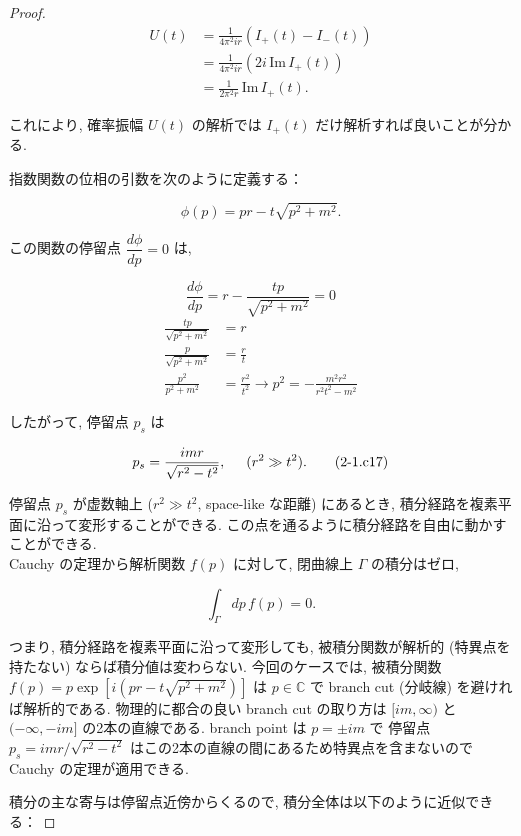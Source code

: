 \documentclass[a4paper,12pt]{article}
\begin{document}
\begin{proof}
\begin{align*}
  U(t) &= \frac{1}{4\pi^2 ir} \left( I_+(t) - I_-(t) \right) \tag{2-1.c9} \\
  &= \frac{1}{4\pi^2 ir} \left( 2i \, \textrm{Im}\, I_+(t) \right) \tag{2-1.c10} \\
  &= \frac{1}{2\pi^2 r} \, \textrm{Im}\, I_+(t). \tag{2-1.c11}
\end{align*}

これにより, 確率振幅 $U(t)$ の解析では $I_+(t)$ だけ解析すれば良いことが分かる.\par
指数関数の位相の引数を次のように定義する：

\begin{equation*}
  \phi(p) = pr - t\sqrt{p^2 + m^2}. \tag{2-1.c12}
\end{equation*}

この関数の停留点 $\dfrac{d\phi}{dp} = 0$ は,

\begin{equation*}
  \frac{d\phi}{dp} = r - \frac{tp}{\sqrt{p^2 + m^2}} = 0 \tag{2-1.c13}
\end{equation*}
\begin{align*}
  \frac{tp}{\sqrt{p^2 + m^2}} &= r \tag{2-1.c14} \\
  \frac{p}{\sqrt{p^2 + m^2}} &= \frac{r}{t} \tag{2-1.c15} \\
  \frac{p^2}{p^2 + m^2} &= \frac{r^2}{t^2} \to p^2 = -\frac{m^2 r^2}{r^2t^2 - m^2} \tag{2-1.c16}
\end{align*}

したがって, 停留点 $p_s$ は

\begin{equation*}
  p_s = \frac{imr}{\sqrt{r^2 - t^2}}, \hspace{0.5cm} (r^2 \gg t^2). \tag{2-1.c17}
\end{equation*}

停留点 $p_s$ が虚数軸上 ($r^2 \gg t^2$, space-like な距離) にあるとき, 積分経路を複素平面に沿って変形することができる. この点を通るように積分経路を自由に動かすことができる.\\
Cauchy の定理から解析関数 $f(p)$ に対して, 閉曲線上 $\Gamma$ の積分はゼロ,

\begin{equation*}
  \int_\Gamma dp \, f(p) = 0. \tag{2-1.c18}
\end{equation*}

つまり, 積分経路を複素平面に沿って変形しても, 被積分関数が解析的 (特異点を持たない) ならば積分値は変わらない. 今回のケースでは, 被積分関数 $f(p) = p \exp\left[i(pr - t\sqrt{p^2 + m^2})\right]$ は $p \in \mathbb{C}$ で branch cut (分岐線) を避ければ解析的である. 物理的に都合の良い branch cut の取り方は $[im, \infty)$ と $(-\infty, -im]$ の2本の直線である. branch point は $p = \pm im$ で 停留点 $p_s = imr/\sqrt{r^2 - t^2}$ はこの2本の直線の間にあるため特異点を含まないので Cauchy の定理が適用できる. \par
積分の主な寄与は停留点近傍からくるので, 積分全体は以下のように近似できる：


\end{proof}
\end{document}
